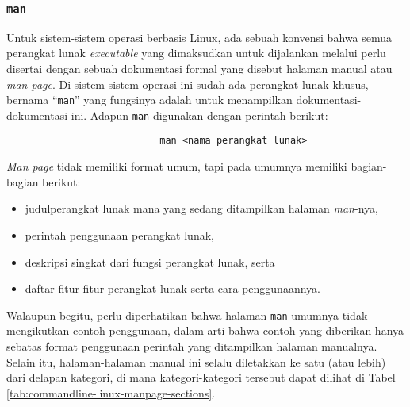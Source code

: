 \subsubsection{\texttt{man} \cite{marsh:2010:fatfreeintrotocommandline} \cite{shottsjr:2019:linuxcommandline}}
\label{sec:commandline-linux-manpage}

Untuk sistem-sistem operasi berbasis Linux, ada sebuah konvensi bahwa semua perangkat lunak \textit{executable} yang dimaksudkan untuk dijalankan melalui \cl\xspace perlu disertai dengan sebuah dokumentasi formal yang disebut halaman manual atau \textit{man page}. Di sistem-sistem operasi ini sudah ada perangkat lunak khusus, bernama ``\verb|man|'' yang fungsinya adalah untuk menampilkan dokumentasi-dokumentasi ini. Adapun \verb|man| digunakan dengan perintah berikut:

\begin{verbatim}
                           man <nama perangkat lunak>
\end{verbatim}
\noindent
\textit{Man page} tidak memiliki format umum, tapi pada umumnya memiliki bagian-bagian berikut:

\begin{itemize}
	\item judul\textemdash perangkat lunak mana yang sedang ditampilkan halaman \textit{man}-nya,
	\item perintah penggunaan perangkat lunak,
	\item deskripsi singkat dari fungsi perangkat lunak, serta
	\item daftar fitur-fitur perangkat lunak serta cara penggunaannya.
\end{itemize}
\noindent
Walaupun begitu, perlu diperhatikan bahwa halaman \verb|man| umumnya tidak mengikutkan contoh penggunaan, dalam arti bahwa contoh yang diberikan hanya sebatas format penggunaan perintah yang ditampilkan halaman manualnya. Selain itu, halaman-halaman manual ini selalu diletakkan ke satu (atau lebih) dari delapan kategori, di mana kategori-kategori tersebut dapat dilihat di Tabel \ref{tab:commandline-linux-manpage-sections}.

